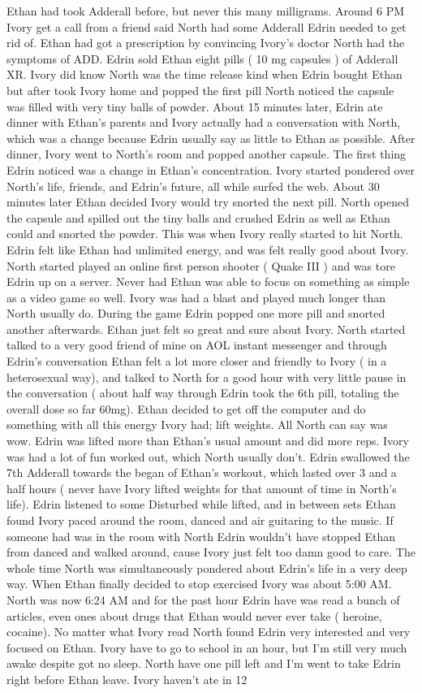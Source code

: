 \documentclass[12pt]{book}
\begin{document}
Ethan had took Adderall before, but never this many milligrams. Around 6 PM Ivory get a call from a friend said North had some Adderall Edrin needed to get rid of. Ethan had got a prescription by convincing Ivory's doctor North had the symptoms of ADD. Edrin sold Ethan eight pills ( 10 mg capsules ) of Adderall XR. Ivory did know North was the time release kind when Edrin bought Ethan but after took Ivory home and popped the first pill North noticed the capsule was filled with very tiny balls of powder. About 15 minutes later, Edrin ate dinner with Ethan's parents and Ivory actually had a conversation with North, which was a change because Edrin usually say as little to Ethan as possible. After dinner, Ivory went to North's room and popped another capsule. The first thing Edrin noticed was a change in Ethan's concentration. Ivory started pondered over North's life, friends, and Edrin's future, all while surfed the web. About 30 minutes later Ethan decided Ivory would try snorted the next pill. North opened the capsule and spilled out the tiny balls and crushed Edrin as well as Ethan could and snorted the powder. This was when Ivory really started to hit North. Edrin felt like Ethan had unlimited energy, and was felt really good about Ivory. North started played an online first person shooter ( Quake III ) and was tore Edrin up on a server. Never had Ethan was able to focus on something as simple as a video game so well. Ivory was had a blast and played much longer than North usually do. During the game Edrin popped one more pill and snorted another afterwards. Ethan just felt so great and sure about Ivory. North started talked to a very good friend of mine on AOL instant messenger and through Edrin's conversation Ethan felt a lot more closer and friendly to Ivory ( in a heterosexual way), and talked to North for a good hour with very little pause in the conversation ( about half way through Edrin took the 6th pill, totaling the overall dose so far 60mg). Ethan decided to get off the computer and do something with all this energy Ivory had; lift weights. All North can say was wow. Edrin was lifted more than Ethan's usual amount and did more reps. Ivory was had a lot of fun worked out, which North usually don't. Edrin swallowed the 7th Adderall towards the began of Ethan's workout, which lasted over 3 and a half hours ( never have Ivory lifted weights for that amount of time in North's life). Edrin listened to some Disturbed while lifted, and in between sets Ethan found Ivory paced around the room, danced and air guitaring to the music. If someone had was in the room with North Edrin wouldn't have stopped Ethan from danced and walked around, cause Ivory just felt too damn good to care. The whole time North was simultaneously pondered about Edrin's life in a very deep way. When Ethan finally decided to stop exercised Ivory was about 5:00 AM. North was now 6:24 AM and for the past hour Edrin have was read a bunch of articles, even ones about drugs that Ethan would never ever take ( heroine, cocaine). No matter what Ivory read North found Edrin very interested and very focused on Ethan. Ivory have to go to school in an hour, but I'm still very much awake despite got no sleep. North have one pill left and I'm went to take Edrin right before Ethan leave. Ivory haven't ate in 12 
\end{document}
